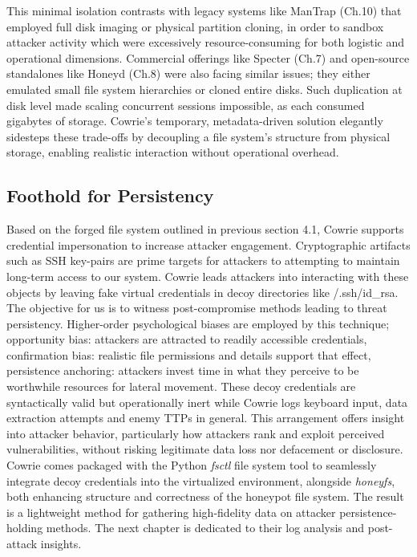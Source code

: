 \documentclass{cls/ULBreport}
\begin{document}
This minimal isolation contrasts with legacy systems like ManTrap (Ch.10) that employed full disk imaging or physical partition cloning, in order to sandbox attacker activity which were excessively resource-consuming for both logistic and operational dimensions. Commercial offerings like Specter (Ch.7) and open-source standalones like Honeyd (Ch.8) were also facing similar issues; they either emulated small file system hierarchies or cloned entire disks. Such duplication at disk level made scaling concurrent sessions impossible, as each consumed gigabytes of storage. Cowrie's temporary, metadata-driven solution elegantly sidesteps these trade-offs by decoupling a file system's structure from physical storage, enabling realistic interaction without operational overhead.


    \subsection{Foothold for Persistency}

Based on the forged file system outlined in previous section 4.1, Cowrie supports credential impersonation to increase attacker engagement. Cryptographic artifacts such as SSH key-pairs are prime targets for attackers to attempting to maintain long-term access to our system. Cowrie leads attackers into interacting with these objects by leaving fake virtual credentials in decoy directories like \˜/.ssh/id\_rsa. The objective for us is to witness post-compromise methods leading to threat persistency. Higher-order psychological biases are employed by this technique; opportunity bias: attackers are attracted to readily accessible credentials, confirmation bias: realistic file permissions and details support that effect, persistence anchoring: attackers invest time in what they perceive to be worthwhile resources for lateral movement. These decoy credentials are syntactically valid but operationally inert while Cowrie logs keyboard input, data extraction attempts and enemy TTPs in general. This arrangement offers insight into attacker behavior, particularly how attackers rank and exploit perceived vulnerabilities, without risking legitimate data loss nor defacement or disclosure. Cowrie comes packaged with the Python \textit{fsctl} file system tool to seamlessly integrate decoy credentials into the virtualized environment, alongside \textit{honeyfs}, both enhancing structure and correctness of the honeypot file system. The result is a lightweight method for gathering high-fidelity data on attacker persistence-holding methods. The next chapter is dedicated to their log analysis and post-attack insights.
\end{document}
